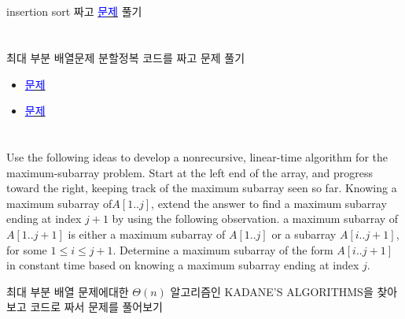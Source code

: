 \documentclass{oblivoir}
\begin{document}
   \section{}
   
   insertion sort 짜고 \href{https://www.acmicpc.net/problem/2750}{\textcolor{blue}{문제}} 풀기

   
   \section{}
   
   최대 부분 배열문제 분할정복 코드를 짜고 문제 풀기

   \begin{itemize}
      \item \href{https://www.acmicpc.net/problem/1912}{\textcolor{blue}{문제}}
      
      \item \href{https://www.acmicpc.net/problem/10211}{\textcolor{blue}{문제}}
   \end{itemize}
   

   \section{}
   
   Use the following ideas to develop a nonrecursive, linear-time algorithm for the maximum-subarray problem. 
   Start at the left end of the array, and progress toward the right, keeping track of the maximum subarray seen so far. 
   Knowing a maximum subarray of$ A[1.. j]$, extend the answer to find a maximum subarray ending at index $j+1$ by using the following observation. a maximum subarray of$ A[1.. j+1]$
is either a maximum subarray of $A[1.. j]$ or a subarray $A[i.. j + 1]$, for some
$1 \le i \le j + 1$. Determine a maximum subarray of the form $A[i.. j + 1]$ in
constant time based on knowing a maximum subarray ending at index $j$.

   최대 부분 배열 문제에대한 $\Theta(n)$ 알고리즘인 KADANE'S ALGORITHMS을 찾아보고 코드로 짜서 문제를 풀어보기
   
\end{document}
